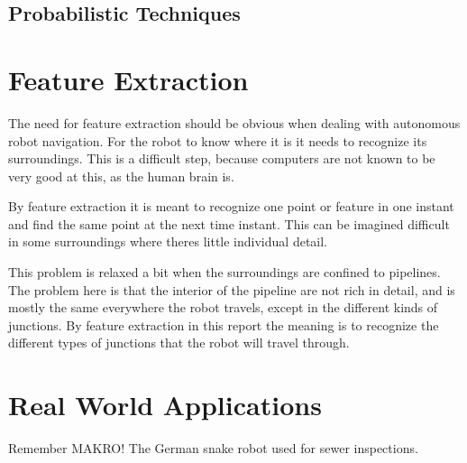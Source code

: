 \subsection{Probabilistic Techniques}



\section{Feature Extraction}
The need for feature extraction should be obvious when dealing with autonomous robot
navigation. For the robot to know where it is it needs to recognize its surroundings. This
is a difficult step, because computers are not known to be very good at this, as the human
brain is. 

By feature extraction it is meant to recognize one point or feature in one instant and
find the same point at the next time instant. This can be imagined difficult in some
surroundings where theres little individual detail. 

This problem is relaxed a bit when the surroundings are confined to pipelines. The problem
here is that the interior of the pipeline are not rich in detail, and is mostly the same
everywhere the robot travels, except in the different kinds of junctions. By feature
extraction in this report the meaning is to recognize the different types of junctions
that the robot will travel through. 

\cite{theilemann-breivik}




\section{Real World Applications}

Remember MAKRO! The German snake robot used for sewer inspections. 



